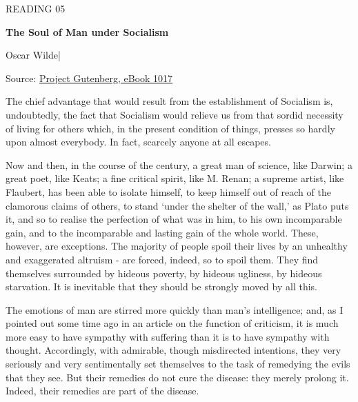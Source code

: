 \begingroup

\thispagestyle{fancy}
\label{article-05}
\begingroup\raggedright
\setlength{\parindent}{0pt}
{\fontsize{9}{12}\selectfont\color{headgrey}READING 05\par}
\vspace{4pt}
{\fontsize{24}{30}\selectfont\bfseries The Soul of Man under Socialism\par}
\vspace{7pt}
{\fontsize{12}{18}\selectfont Oscar Wilde\quad|\par}
\vspace{4pt}
{\fontsize{9}{12.5}\selectfont\color{headgrey}Source: \href{https://www.gutenberg.org/ebooks/1017}{Project Gutenberg, eBook 1017}\par}
\endgroup
\vspace{6pt}

The chief advantage that would result from the establishment of Socialism is, undoubtedly, the fact that Socialism would relieve us from that sordid necessity of living for others which, in the present condition of things, presses so hardly upon almost everybody. In fact, scarcely anyone at all escapes.\par

Now and then, in the course of the century, a great man of science, like Darwin; a great poet, like Keats; a fine critical spirit, like M. Renan; a supreme artist, like Flaubert, has been able to isolate himself, to keep himself out of reach of the clamorous claims of others, to stand ‘under the shelter of the wall,’ as Plato puts it, and so to realise the perfection of what was in him, to his own incomparable gain, and to the incomparable and lasting gain of the whole world. These, however, are exceptions. The majority of people spoil their lives by an unhealthy and exaggerated altruism - are forced, indeed, so to spoil them. They find themselves surrounded by hideous poverty, by hideous ugliness, by hideous starvation. It is inevitable that they should be strongly moved by all this.\par

The emotions of man are stirred more quickly than man’s intelligence; and, as I pointed out some time ago in an article on the function of criticism, it is much more easy to have sympathy with suffering than it is to have sympathy with thought. Accordingly, with admirable, though misdirected intentions, they very seriously and very sentimentally set themselves to the task of remedying the evils that they see. But their remedies do not cure the disease: they merely prolong it. Indeed, their remedies are part of the disease.\par

